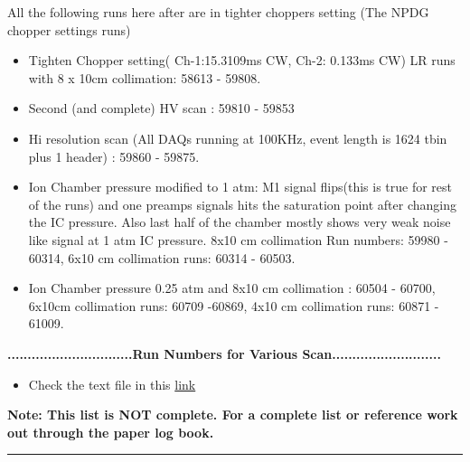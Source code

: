 \documentclass[12pt]{article}
\begin{document}
All the following runs here after are in tighter choppers setting (The  NPDG chopper settings runs)
\begin{itemize}
\item Tighten Chopper setting( Ch-1:15.3109ms CW, Ch-2: 0.133ms CW) LR runs with 8 x 10cm collimation: 58613 - 59808. \\

\item Second (and complete) HV scan : 59810 - 59853

\item Hi resolution scan (All DAQs running at 100KHz, event length is 1624 tbin plus 1 header) : 59860 - 59875.

\item Ion Chamber pressure modified to 1 atm: M1 signal flips(this is true for rest of the runs) and one preamps signals hits the saturation point after changing the IC pressure. Also last half of the chamber mostly shows very weak noise like signal at 1 atm IC pressure. 8x10 cm collimation Run numbers: 59980 - 60314, 6x10 cm collimation runs: 60314 - 60503.  
\item Ion Chamber pressure 0.25 atm and 8x10 cm collimation : 60504 - 60700, 6x10cm collimation runs: 60709 -60869, 4x10 cm collimation runs: 60871 - 61009.
\end{itemize}
\textbf{...............................Run Numbers for Various Scan...........................}
\begin{itemize}
\item Check the text file in this \href{https://raw.githubusercontent.com/latifkabir/n3He_Soft/master/Manual/tex/RunReferences.txt}{link}
\end{itemize} 
\textbf{ Note: This list is NOT complete. For a complete list or reference work out through the paper log book.} \\


\noindent
{\color{red} \rule{\linewidth}{1mm} }

\newpage
\end{document}

